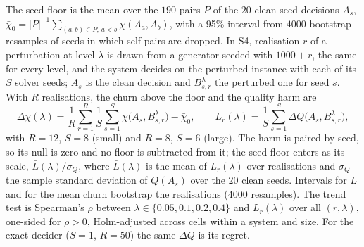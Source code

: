 \documentclass[systems,article,submit,moreauthors,pdftex]{Definitions/mdpi}
\begin{document}
The seed floor is the mean over the $190$ pairs $P$ of the $20$ clean seed decisions $A_s$,
$\bar\chi_0=|P|^{-1}\sum_{(a,b)\in P,\,a<b}\chi(A_a,A_b)$, with a 95\% interval from $4000$
bootstrap resamples of seeds in which self-pairs are dropped. In S4, realisation $r$ of a
perturbation at level $\lambda$ is drawn from a generator seeded with $1000+r$, the same for
every level, and the system decides on the perturbed instance with each of its $S$ solver
seeds; $A_s$ is the clean decision and $B_{s,r}^\lambda$ the perturbed one for seed $s$. With
$R$ realisations, the churn above the floor and the quality harm are
\begin{equation}\label{eq:above-floor}
\Delta\chi(\lambda)=\frac1R\sum_{r=1}^{R}\frac1S\sum_{s=1}^{S}\chi\bigl(A_s,B_{s,r}^{\lambda}\bigr)-\bar\chi_0,
\qquad
L_r(\lambda)=\frac1S\sum_{s=1}^{S}\Delta Q\bigl(A_s,B_{s,r}^{\lambda}\bigr),
\end{equation}
with $R=12$, $S=8$ (small) and $R=8$, $S=6$ (large). The harm is paired by seed, so its null
is zero and no floor is subtracted from it; the seed floor enters as its scale,
$\bar L(\lambda)/\sigma_Q$, where $\bar L(\lambda)$ is the mean of $L_r(\lambda)$ over
realisations and $\sigma_Q$ the sample standard deviation of $Q(A_s)$ over the $20$ clean seeds.
Intervals for $\bar L$ and for the mean churn bootstrap the realisations ($4000$ resamples).
The trend test is Spearman's $\rho$ between $\lambda\in\{0.05,0.1,0.2,0.4\}$ and $L_r(\lambda)$
over all $(r,\lambda)$, one-sided for $\rho>0$, Holm-adjusted across cells within a system
and size. For the exact decider ($S=1$, $R=50$) the same $\Delta Q$ is its regret.
\end{document}
